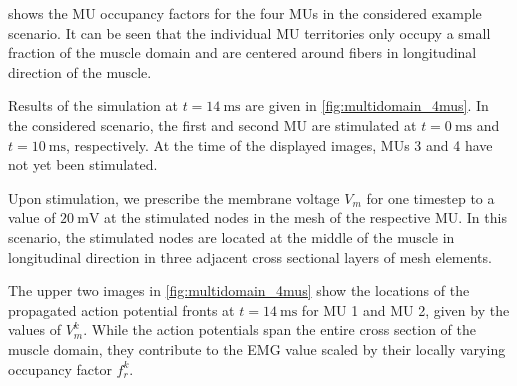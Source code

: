  shows the MU occupancy factors for the four MUs in the considered example scenario. It can be seen that the individual MU territories only occupy a small fraction of the muscle domain and are centered around fibers in longitudinal direction of the muscle.

Results of the simulation at $t=\SI{14}{\ms}$ are given in \cref{fig:multidomain_4mus}. In the considered scenario, the first and second MU are stimulated at $t=\SI{0}{\ms}$ and $t=\SI{10}{\ms}$, respectively. At the time of the displayed images, MUs 3 and 4 have not yet been stimulated. 

Upon stimulation, we prescribe the membrane voltage $V_m$ for one timestep to a value of $\SI{20}{\milli\volt}$ at the stimulated nodes in the mesh of the respective MU. In this scenario, the stimulated nodes are located at the middle of the muscle in longitudinal direction in three adjacent cross sectional layers of mesh elements.

The upper two images in \cref{fig:multidomain_4mus} show the locations of the propagated action potential fronts at $t=\SI{14}{\ms}$ for MU 1 and MU 2, given by the values of $V_m^k$. While the action potentials span the entire cross section of the muscle domain, they contribute to the EMG value scaled by their locally varying occupancy factor $f_r^k$.

